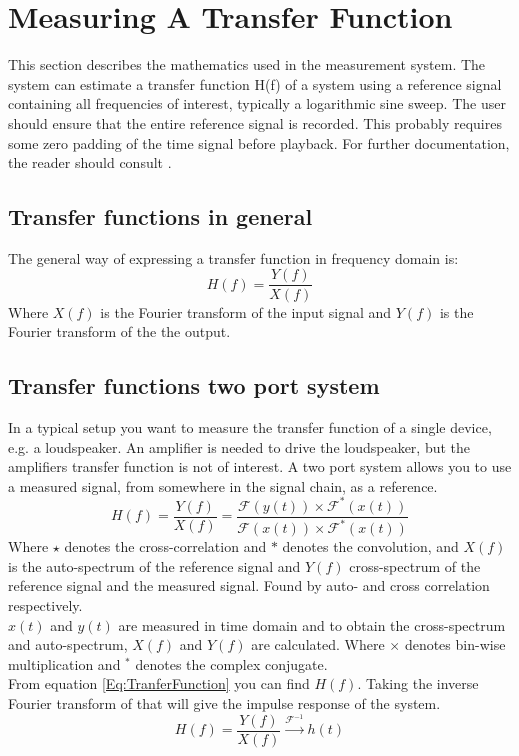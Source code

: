 \section{Measuring A Transfer Function}\label{Sec:MeasATransFunc}
This section describes the mathematics used in the measurement system. The system can estimate a transfer function H(f) of a system using a reference signal containing all frequencies of interest, typically  a logarithmic sine sweep. The user should ensure that the entire reference signal is recorded. This probably requires some zero padding of the time signal before playback. For further documentation, the reader should consult \cite{TutorialMeasurementPowerSpectra}.
\subsection{Transfer functions in general}
The general way of expressing a transfer function in frequency domain is:
\begin{equation}
H(f)=\frac{Y(f)}{X(f)}
\label{Eq:TranferFunction}
\end{equation}
Where $X(f)$ is the Fourier transform of the input signal and $Y(f)$ is the Fourier transform of the the output.  

\subsection{Transfer functions two port system}
In a typical setup you want to measure the transfer function of a single device, e.g. a loudspeaker. An amplifier is needed to drive the loudspeaker, but the amplifiers transfer function is not of interest. A two port system allows you to use a measured signal, from somewhere in the signal chain, as a reference. 
\begin{equation}
H(f)=\frac{Y(f)}{X(f)}=\frac{\mathscr{F}(y(t))\times\mathscr{F}^{\ast}(x(t))}{\mathscr{F}(x(t))\times\mathscr{F}^{\ast}(x(t))}
\label{Eq:TranferFunctionTwoPort}
\end{equation}
Where $\star $ denotes the cross-correlation and $\ast $ denotes the convolution, and 
 $X(f)$ is the auto-spectrum of the reference signal and $Y(f)$ cross-spectrum of the reference signal and the measured signal. Found by auto- and cross correlation respectively.\\
$x(t)$ and $y(t)$ are measured in time domain and to obtain the cross-spectrum and auto-spectrum, $X(f)$ and $Y(f)$ are calculated.
Where $\times$ denotes bin-wise multiplication and $^{\ast}$ denotes the complex conjugate. \\
From equation \ref{Eq:TranferFunction} %
you can find $H(f)$. Taking the inverse Fourier transform of that will give the impulse response of the system. 
\begin{equation}
H(f) = \frac{Y(f)}{X(f)} \xrightarrow{\mathscr{F}^{-1}} h(t)
\label{Eq:Impulseresponse}
\end{equation} 


